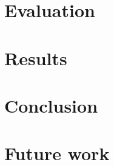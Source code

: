 \documentclass[12pt]{article}
\begin{document}
\section{Evaluation}

\section{Results}

\section{Conclusion}

\section{Future work}



\end{document}
